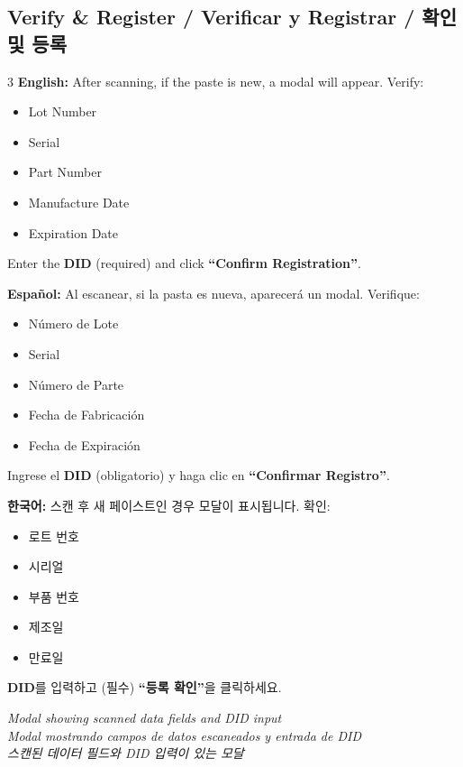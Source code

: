 \documentclass[12pt,a4paper]{article}
\begin{document}
\subsection{Verify \& Register / Verificar y Registrar / 확인 및 등록}

\begin{multicols}{3}
\textbf{English:}
After scanning, if the paste is new, a modal will appear. Verify:
\begin{itemize}[leftmargin=*]
\item Lot Number
\item Serial
\item Part Number
\item Manufacture Date
\item Expiration Date
\end{itemize}
Enter the \textbf{DID} (required) and click \textbf{``Confirm Registration''}.

\columnbreak
\textbf{Español:}
Al escanear, si la pasta es nueva, aparecerá un modal. Verifique:
\begin{itemize}[leftmargin=*]
\item Número de Lote
\item Serial
\item Número de Parte
\item Fecha de Fabricación
\item Fecha de Expiración
\end{itemize}
Ingrese el \textbf{DID} (obligatorio) y haga clic en \textbf{``Confirmar Registro''}.

\columnbreak
\textbf{한국어:}
스캔 후 새 페이스트인 경우 모달이 표시됩니다. 확인:
\begin{itemize}[leftmargin=*]
\item 로트 번호
\item 시리얼
\item 부품 번호
\item 제조일
\item 만료일
\end{itemize}
\textbf{DID}를 입력하고 (필수) \textbf{``등록 확인''}을 클릭하세요.
\end{multicols}

\begin{photobox}
\centering
\vspace{4cm}
\textit{Modal showing scanned data fields and DID input\\
Modal mostrando campos de datos escaneados y entrada de DID\\
스캔된 데이터 필드와 DID 입력이 있는 모달}
\vspace{0.5cm}
\end{photobox}
\end{document}
